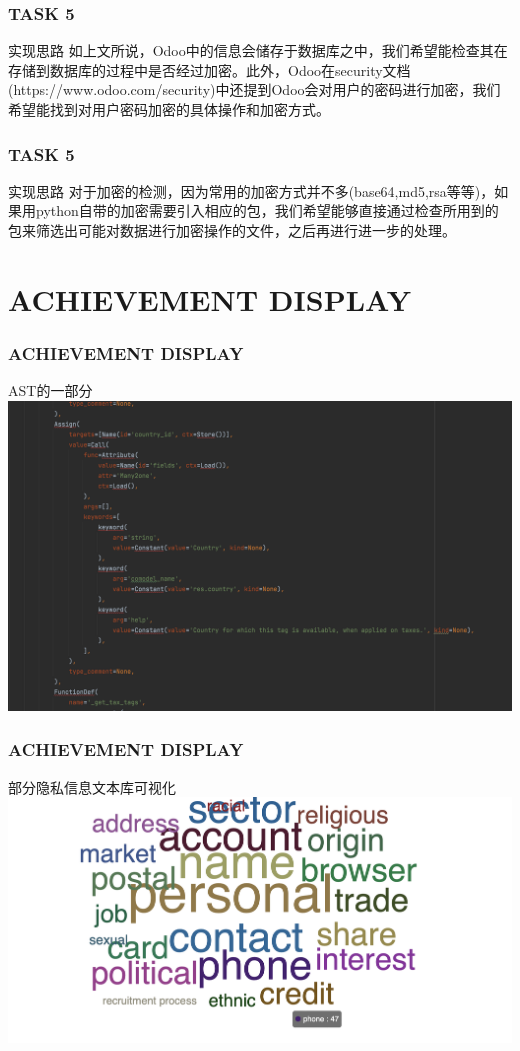 \documentclass[10pt]{ctexbeamer}
\begin{document}
    \begin{frame}
        \frametitle{TASK 5}
        \begin{block}{实现思路}
            如上文所说，Odoo中的信息会储存于数据库之中，我们希望能检查其在存储到数据库的过程中是否经过加密。此外，Odoo在security文档(https://www.odoo.com/security)中还提到Odoo会对用户的密码进行加密，我们希望能找到对用户密码加密的具体操作和加密方式。
        \end{block}
    \end{frame}

    \begin{frame}
        \frametitle{TASK 5}
        \begin{block}{实现思路}
            对于加密的检测，因为常用的加密方式并不多(base64,md5,rsa等等)，如果用python自带的加密需要引入相应的包，我们希望能够直接通过检查所用到的包来筛选出可能对数据进行加密操作的文件，之后再进行进一步的处理。
        \end{block}
    \end{frame}

    \section{ACHIEVEMENT DISPLAY}
    \begin{frame}
        \frametitle{ACHIEVEMENT DISPLAY}
    
        \begin{block}{AST的一部分}
            \includegraphics[scale=0.268]{AST.png}
        \end{block}
    \end{frame}

    \begin{frame}
        \frametitle{ACHIEVEMENT DISPLAY}
    
        \begin{block}{部分隐私信息文本库可视化}
            \includegraphics[scale=0.305]{dictionary.png}
        \end{block}
    \end{frame}
\end{document}
